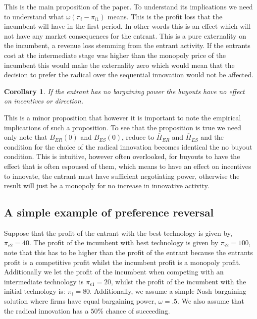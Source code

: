 \documentclass[11pt]{article}
\newtheorem{corollary}{Corollary}
\begin{document}
This is the main proposition of the paper. To understand its implications we need to understand what $\omega(\pi_i- \pi_{i1}) $ means. This is the profit loss that the incumbent will have in the first period. In other words this is an effect which will not have any market consequences for the entrant. This is a pure externality on the incumbent, a revenue loss stemming from the entrant activity. If the entrants cost at the intermediate stage was higher than the monopoly price of the incumbent this would make the externality zero which would mean that the decision to prefer the radical over the sequential innovation would not be affected.  

\begin{corollary}
If the entrant has no bargaining power the buyouts have no effect on incentives or direction.  
\end{corollary}

This is a minor proposition that however it is important to note the empirical implications of such a proposition. To see that the proposition is true we need only note that $B_{ER}(0)$ and $B_{ES}(0)$, reduce to $\overline{\Pi}_{ER}$ and $\overline{\Pi}_{ES}$ and the condition for the choice of the radical innovation becomes identical the no buyout condition. This is intuitive, however often overlooked, for buyouts to have the effect that is often espoused of them, which means to have an effect on incentives to innovate, the entrant must have sufficient negotiating power, otherwise the result will just be a monopoly for no increase in innovative activity. 

\subsection*{A simple example of preference reversal}

Suppose that the profit of the entrant with the best technology is given by, $\pi_{e2}=40$. The profit of the incumbent with best technology is given by $\pi_{i2}=100$, note that this has to be higher than the profit of the entrant because the entrants profit is a competitive profit whilst the incumbent profit is a monopoly profit. Additionally we let the profit of the incumbent when competing with an intermediate technology is $\pi_{e1}=20$, whilst the profit of the incumbent with the initial technology is: $\pi_{i}=80$. Additionally, we assume a simple Nash bargaining solution where firms have equal bargaining power, $\omega = .5$. We also assume that the radical innovation has a $50$\% chance of succeeding. 
\end{document}
